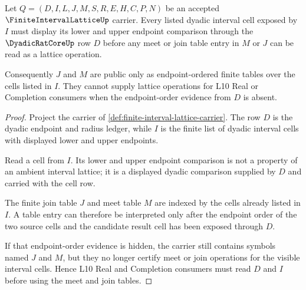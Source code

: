 \begin{theorem}
\label{thm:finite-interval-lattice-endpoint-order}
Let $Q=(D,I,L,J,M,S,R,E,H,C,P,N)$ be an accepted $\FiniteIntervalLatticeUp$ carrier. Every listed dyadic interval cell exposed by $I$ must display its lower and upper endpoint comparison through the $\DyadicRatCoreUp$ row $D$ before any meet or join table entry in $M$ or $J$ can be read as a lattice operation.

Consequently $J$ and $M$ are public only as endpoint-ordered finite tables over the cells listed in $I$. They cannot supply lattice operations for L10 Real or Completion consumers when the endpoint-order evidence from $D$ is absent.
\end{theorem}
\begin{proof}
Project the carrier of \autoref{def:finite-interval-lattice-carrier}. The row $D$ is the dyadic endpoint and radius ledger, while $I$ is the finite list of dyadic interval cells with displayed lower and upper endpoints.

Read a cell from $I$. Its lower and upper endpoint comparison is not a property of an ambient interval lattice; it is a displayed dyadic comparison supplied by $D$ and carried with the cell row.

The finite join table $J$ and meet table $M$ are indexed by the cells already listed in $I$. A table entry can therefore be interpreted only after the endpoint order of the two source cells and the candidate result cell has been exposed through $D$.

If that endpoint-order evidence is hidden, the carrier still contains symbols named $J$ and $M$, but they no longer certify meet or join operations for the visible interval cells. Hence L10 Real and Completion consumers must read $D$ and $I$ before using the meet and join tables.
\end{proof}

